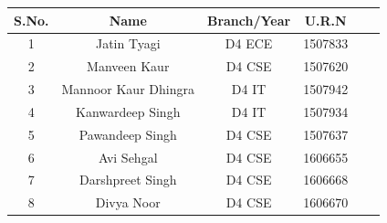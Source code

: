 \documentclass[12pt, a4 paper]{article}
\begin{document}
\begin{table}[h!]
  \begin{center}
    \begin{tabular}{|c|c|c|c|c|c|} 
    \toprule %
      \textbf{S.No.} & \textbf{Name} & \textbf{Branch/Year} & \textbf{U.R.N} \\
      \midrule %
      1	& Jatin Tyagi	       & D4 ECE	& 1507833 \\
      2	& Manveen Kaur	       & D4 CSE	& 1507620 \\
      3	& Mannoor Kaur Dhingra & D4 IT	& 1507942 \\
      4	& Kanwardeep Singh	   & D4 IT	& 1507934 \\
      5	& Pawandeep Singh	   & D4 CSE	& 1507637 \\
      6	& Avi Sehgal	       & D4 CSE	& 1606655 \\
      7	& Darshpreet Singh	   & D4 CSE	& 1606668 \\
      8	& Divya Noor 	       & D4 CSE	& 1606670 \\

      \bottomrule %
    \end{tabular}
  \end{center}
\end{table}

\newpage




\end{document}
